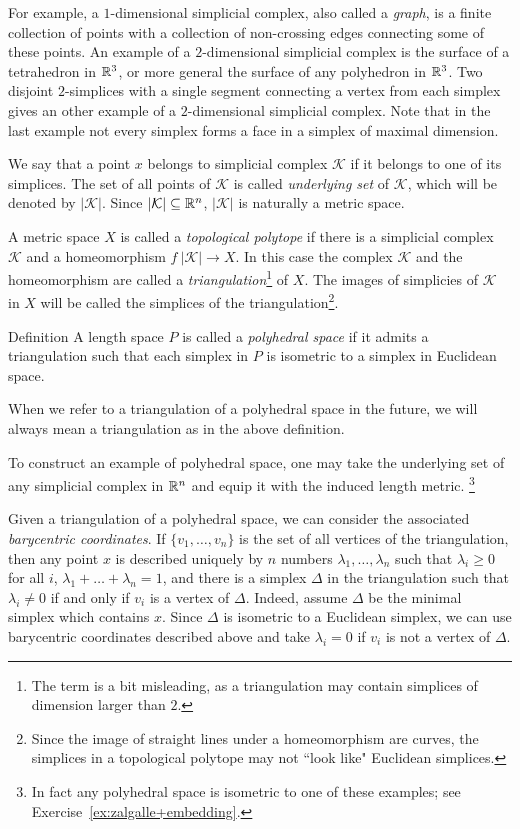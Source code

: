 For example, a $1$-dimensional simplicial complex,
also called a \emph{graph},
is a finite collection of points 
with a collection of non-crossing edges connecting some of these points.  
An example of a $2$-dimensional simplicial complex is the surface of a tetrahedron in $\mathbb{R}^3$, or more general the surface of any polyhedron in $\mathbb{R}^3$.  
Two disjoint $2$-simplices with a single segment connecting a vertex from each simplex gives an other example of a $2$-dimensional simplicial complex.
Note that in the last example 
not every simplex forms a face in a simplex of maximal dimension.

We say that a point $x$ belongs to simplicial complex $\mathcal{K}$ if it belongs to one of its simplices.
The set of all points of  $\mathcal{K}$ is called \emph{underlying set} of $\mathcal{K}$,
which will be denoted by $|\mathcal{K}|$.  Since $|\mathcal{K}| \subseteq \mathbb{R}^n$, $|\mathcal{K}|$ is naturally a metric space.

A metric space $X$ is called a \emph{topological polytope}
if there is a simplicial complex $\mathcal{K}$
and a homeomorphism
$f\:|\mathcal{K}|\to X$.
In this case the complex $\mathcal{K}$ and the homeomorphism are called a
\emph{triangulation}\footnote{The term is a bit misleading, as a triangulation may contain simplices of dimension larger than $2$.} 
of $X$.
The images of simplicies of $\mathcal{K}$ in $X$ will be called the simplices of the triangulation\footnote{Since the image of straight lines under a homeomorphism are curves, the simplices in a topological polytope may not ``look like" Euclidean simplices.}.

\begin{thm}{Definition}\label{def:poly}
A length space $P$ is called a \emph{polyhedral space}
if it admits a triangulation such that each simplex in $P$ is isometric to a simplex in Euclidean space.
\end{thm}

When we refer to a triangulation of a polyhedral space in the future, we will always mean a triangulation as in the above definition.

To construct an example of polyhedral space,
one may take the underlying set of any simplicial complex in $\mathbb{R}^n$
and equip it with the induced length metric.%
\footnote{In fact any polyhedral space is  isometric to one of these examples; see Exercise~\ref{ex:zalgalle+embedding}.}

Given a triangulation of a polyhedral space, 
we can consider the associated \emph{barycentric coordinates}.
If $\{v_1,\dots,v_n\}$ is the set of all vertices of the triangulation,
then any point $x$ is described uniquely by $n$ numbers $\lambda_1,\dots,\lambda_n$
such that $\lambda_i\ge 0$ for all $i$,
$\lambda_1+\dots+\lambda_n=1$,
and there is a simplex $\Delta$ in the triangulation such that
$\lambda_i\ne 0$ if and only if $v_i$ is a vertex of $\Delta$.
Indeed, assume $\Delta$ be the minimal simplex which contains $x$.
Since $\Delta$ is isometric to a Euclidean simplex,
we can use barycentric coordinates described above and take $\lambda_i=0$
if $v_i$ is not a vertex of $\Delta$.

